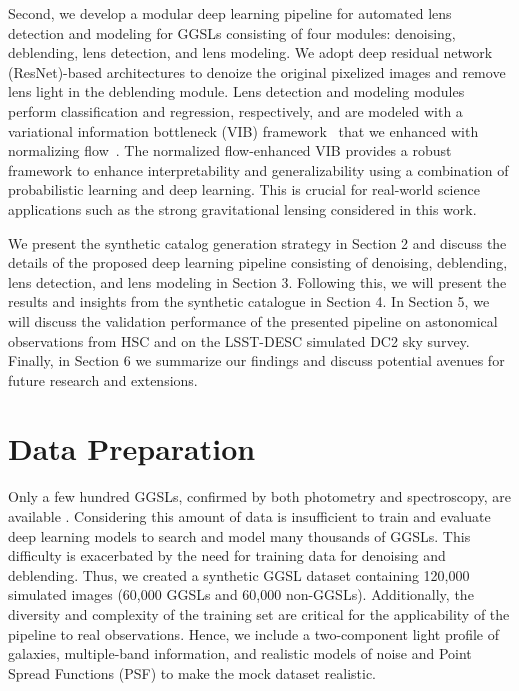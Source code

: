 \documentclass[12pt, twocolumn, apj]{openjournal}
\begin{document}
Second, we develop a modular deep learning pipeline for automated lens detection and modeling for GGSLs consisting of four modules: denoising, deblending, lens detection, and lens modeling. We adopt deep residual network~\cite{he2016deep} (ResNet)-based architectures to denoize the original pixelized images and remove lens light in the deblending module. Lens detection and modeling modules perform classification and regression, respectively, and are modeled with a variational information bottleneck (VIB) framework~\citep{alemi2017VIB} that we enhanced with normalizing flow~\cite{kobyzev2020normalizing}. The normalized flow-enhanced VIB provides a robust framework to enhance interpretability and generalizability using a combination of probabilistic learning and deep learning. This is crucial for real-world science applications such as the strong gravitational lensing considered in this work.

We present the synthetic catalog generation strategy in Section 2 and discuss the details of the proposed deep learning pipeline consisting of denoising, deblending,  lens detection, and lens modeling in Section 3. Following this, we will present the results and insights from the synthetic catalogue in Section 4. In Section 5, we will discuss the validation performance of the presented pipeline on astonomical observations from HSC and on the LSST-DESC simulated DC2 sky survey. Finally, in Section 6 we summarize our findings and discuss potential avenues for future research and extensions.

\section{Data Preparation}
\label{sec:data_prep}
Only a few hundred GGSLs, confirmed by both photometry and spectroscopy, are available \citep{Treu2010SLReview, hsc3_jaelani, warps2016, des_lens}. Considering this amount of data is insufficient to train and evaluate deep learning models to search and model many thousands of GGSLs. This difficulty is exacerbated by the need for training data for denoising and deblending. Thus, we created a synthetic GGSL dataset containing 120,000 simulated images (60,000 GGSLs and 60,000 non-GGSLs). Additionally, the diversity and complexity of the training set are critical for the applicability of the pipeline to real observations. Hence, we include a two-component light profile of galaxies, multiple-band information, and realistic models of noise and Point Spread Functions (PSF) to make the mock dataset realistic.
\end{document}
